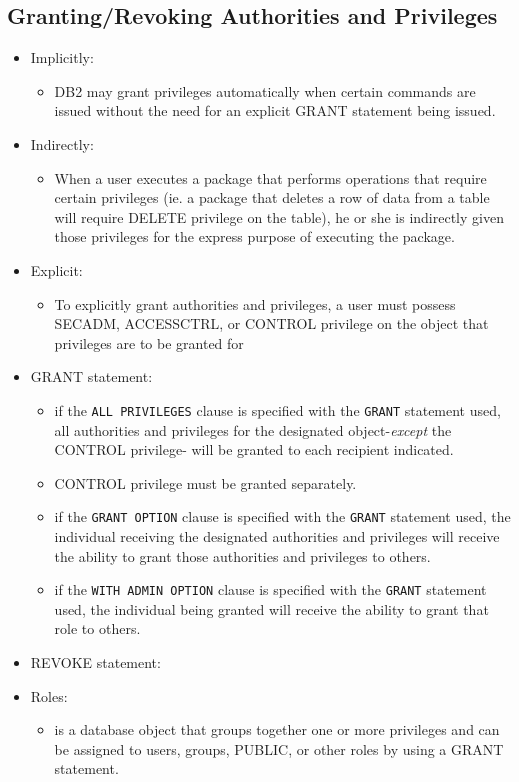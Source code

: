 \documentclass{article}
\begin{document}
\subsection{Granting/Revoking Authorities and Privileges}
\begin{itemize}
\item Implicitly:
	\begin{itemize}
	\item DB2 may grant privileges automatically when certain commands are issued without the need for an 
	explicit GRANT statement being issued.
	\end{itemize}
\item Indirectly:
	\begin{itemize}
	\item When a user executes a package that performs operations that require certain privileges
	(ie. a package that deletes a row of data from a table will require DELETE privilege on the table),
	he or she is indirectly given those privileges for the express purpose of executing the package.
	\end{itemize}
\item Explicit:
	\begin{itemize}
	\item To explicitly grant authorities and privileges, a user must possess SECADM, ACCESSCTRL, or
	{\color{green} CONTROL privilege on the object that privileges are to be granted for}
	\end{itemize}
\item GRANT statement:
	\begin{itemize}
	\item if the \texttt{ALL PRIVILEGES} clause is specified with the \texttt{GRANT} statement used,
	all authorities and privileges for the designated object-\textit{except} the CONTROL privilege-
	will be granted to each recipient indicated.
	\item CONTROL privilege must be granted separately.
	\item if the \texttt{GRANT OPTION} clause is specified with the \texttt{GRANT} statement used,
	the individual receiving the designated authorities and privileges will receive the ability
	to grant those authorities and privileges to others.
	\item if the \texttt{WITH ADMIN OPTION} clause is specified with the \texttt{GRANT} statement used,
	the individual being granted will receive the ability to grant that role to others.
	\end{itemize}
\item REVOKE statement:
\item Roles:
	\begin{itemize}
	\item is a database object that groups together one or more privileges and can be assigned to users,
	groups, PUBLIC, or other roles by using a GRANT statement.
	\end{itemize}
\end{itemize}
\end{document}
